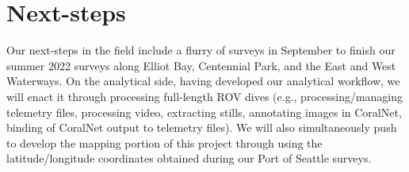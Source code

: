 \documentclass[11pt]{article}
\begin{document}
\section{Next-steps}
Our next-steps in the field include a flurry of surveys in September to 
finish our summer 2022 surveys along Elliot Bay, Centennial Park, and 
the East and West Waterways. 
On the analytical side, having developed our analytical workflow, we 
will enact it through processing full-length ROV dives (e.g., 
processing/managing telemetry files, processing video, extracting 
stills, annotating images in CoralNet, binding of CoralNet output to 
telemetry files).
We will also simultaneously push to develop the mapping portion of this 
project through using the latitude/longitude coordinates obtained 
during our Port of Seattle surveys. 





\end{document}
